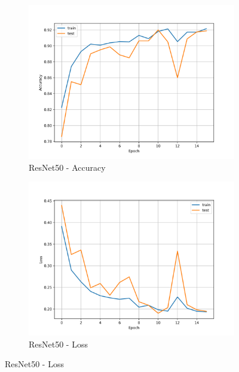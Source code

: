 \documentclass[11pt]{article}
\begin{document}
\begin{figure}[H]
		
		\begin{subfigure}[b]{0.49\textwidth}
			\centering
			\includegraphics[width=\linewidth, trim=20 10 20 10, clip]{assets/accuracy_curve/resnet50_accuracy_curve.png}
			\caption{ResNet50 - Accuracy}
		\end{subfigure}
		\hfill
		\begin{subfigure}[b]{0.49\textwidth}
			\centering
			\includegraphics[width=\linewidth, trim=20 10 20 10, clip]{assets/loss_curve/resnet50_loss_curve.png}
			\caption{ResNet50 - Loss}
		\end{subfigure}
		

\end{figure}
\end{document}
